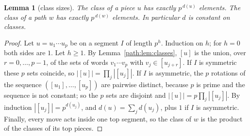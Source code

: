 \documentclass[11pt]{article}
\newtheorem{lemma}[theorem]{Lemma}
\theoremstyle{definition}
\theoremstyle{remark}
\numberwithin{equation}{section}
\numberwithin{figure}{section}
\begin{document}
\begin{lemma}[class sizes]\label{path:lem:size}
The class of a piece $u$ has exactly $p^{\,d(u)}$ elements. The class of a path $w$ has
exactly $p^{\,d(w)}$ elements. In particular $d$ is constant on classes.
\end{lemma}
\begin{proof}
Let $u=u_1\cdots u_p$ be on a segment $I$ of length $p^h$. Induction on $h$; for $h=0$ both sides are $1$. Let $h\ge 1$. By Lemma~\ref{path:lem:classes},
$[u]$ is the union, over $r=0,\dots,p-1$, of the sets of words $v_1\cdots v_p$ with $v_j\in[u_{j+r}]$.
If $I$ is symmetric these $p$ sets coincide, so $|[u]|=\prod_j|[u_j]|$. If $I$ is asymmetric, the $p$ rotations
of the sequence $([u_1],\dots,[u_p])$ are pairwise distinct, because $p$ is prime and the sequence is not constant;
so the $p$ sets are disjoint and $|[u]|=p\prod_j|[u_j]|$. By induction $|[u_j]|=p^{d(u_j)}$, and
$d(u)=\sum_j d(u_j)$, plus $1$ if $I$ is asymmetric.
Finally, every move acts inside one top segment, so the class of $w$ is the product of the classes of its top pieces.
\end{proof}
\end{document}

